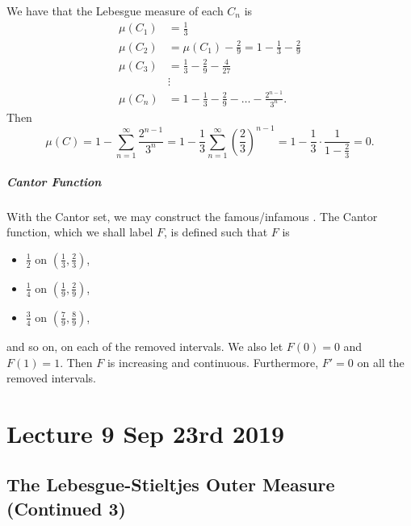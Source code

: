 \documentclass[notoc,notitlepage]{tufte-book}
\begin{document}
We have that the Lebesgue measure of each $C_n$ is
\begin{align*}
  \mu(C_1) &= \frac{1}{3} \\
  \mu(C_2) &= \mu(C_1) - \frac{2}{9} = 1 - \frac{1}{3} - \frac{2}{9} \\
  \mu(C_3) &= \frac{1}{3} - \frac{2}{9} - \frac{4}{27} \\
        &\vdots \\
  \mu(C_n) &= 1 - \frac{1}{3} - \frac{2}{9} - \hdots - \frac{2^{n-1}}{3^n}.
\end{align*}
Then
\begin{equation*}
  \mu(C) = 1 - \sum_{n=1}^{\infty} \frac{2^{n-1}}{3^n} 
  = 1 - \frac{1}{3} \sum_{n=1}^{\infty} \left( \frac{2}{3} \right)^{n-1}
  = 1 - \frac{1}{3} \cdot \frac{1}{1 - \frac{2}{3}} = 0.
\end{equation*}

\paragraph{Cantor Function}\label{para:cantor_function}

With the Cantor set,
we may construct the famous/infamous .
The Cantor function, which we shall label $F$, is defined such that
$F$ is
\begin{itemize}
  \item $\frac{1}{2}$ on $\left( \frac{1}{3}, \frac{2}{3} \right)$,
  \item $\frac{1}{4}$ on $\left( \frac{1}{9}, \frac{2}{9} \right)$,
  \item $\frac{3}{4}$ on $\left( \frac{7}{9}, \frac{8}{9} \right)$,
\end{itemize}
and so on, on each of the removed intervals.
We also let $F(0) = 0$ and $F(1) = 1$.
Then $F$ is increasing and continuous.
Furthermore, $F' = 0$ on all the removed intervals.



\chapter{Lecture 9 Sep 23rd 2019}%
\label{chp:lecture_9_sep_23rd_2019}

\section{The Lebesgue-Stieltjes Outer Measure (Continued 3)}%
\label{sec:the_lebesgue_stieltjes_outer_measure_continued_3}
\end{document}
